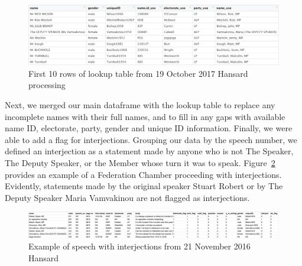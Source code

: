 \documentclass[
  letterpaper,
  DIV=11,
  numbers=noendperiod]{scrartcl}
\begin{document}
\begin{figure}

{\centering \includegraphics[width=4.66667in,height=\textheight]{lookup_ex.png}

}

\caption{\label{fig-lookup}First 10 rows of lookup table from 19 October
2017 Hansard processing}

\end{figure}

Next, we merged our main dataframe with the lookup table to replace any
incomplete names with their full names, and to fill in any gaps with
available name ID, electorate, party, gender and unique ID information.
Finally, we were able to add a flag for interjections. Grouping our data
by the speech number, we defined an interjection as a statement made by
anyone who is not The Speaker, The Deputy Speaker, or the Member whose
turn it was to speak. Figure~\ref{fig-interject} provides an example of
a Federation Chamber proceeding with interjections. Evidently,
statements made by the original speaker Stuart Robert or by The Deputy
Speaker Maria Vamvakinou are not flagged as interjections.

\begin{figure}

{\centering \includegraphics{interject_ex.png}

}

\caption{\label{fig-interject}Example of speech with interjections from
21 November 2016 Hansard}

\end{figure}
\end{document}
